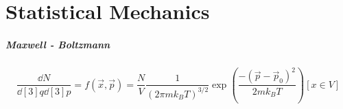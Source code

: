 \documentclass[main.tex]{subfiles}
\begin{document}
\chapter{Statistical Mechanics}

\paragraph{Maxwell - Boltzmann}

\begin{equation}
    \frac{\dd{N}}{\dd[3]{q} \dd[3]{p} }= 
    f( \vec{x} , \vec{p}) = \frac{N}{V} \frac{1}{(2 \pi m k_B T)^{3/2}} \exp(\frac{-(\vec{p} - \vec{p}_0  )^2}{2m k_B T}) [x \in V]
\end{equation}
\end{document}
